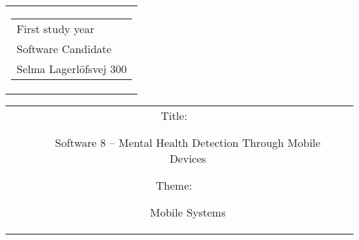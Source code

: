 

\thispagestyle{empty}
\begin{titlingpage}
 \begin{nopagebreak}
 {\samepage 
 \begin{tabular}{r}
\parbox{\textwidth}{  
 \hfill \parbox{4.9cm}{\begin{tabular}{l}
{\small First study year} \\
{\small Software Candidate} \\
{\small Selma Lagerlöfsvej 300} \\
 \end{tabular}}
}
\end{tabular}

 \begin{tabular}{cc}
\parbox{7cm}{
\begin{description}

\item[Title:] 

Software 8 -- Mental Health Detection Through Mobile Devices
  
\item[Theme:]

Mobile Systems


 \end{description}

\parbox{8cm}{

}}
\end{tabular}}
\end{nopagebreak}
\end{titlingpage}
